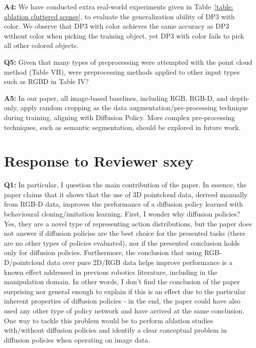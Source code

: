 \noindent\textbf{A4:} We have conducted extra real-world experiments given in Table~\ref{table: ablation cluttered scenes}, to evaluate the generalization ability of DP3 with color. We observe that DP3 with color achieves the same accuracy as DP3 without color when picking the training object, yet DP3 with color fails to pick all other colored objects.

\vspace{0.1in}

\noindent\textbf{Q5:} Given that many types of preprocessing were attempted with the point cloud method (Table VII), were preprocessing methods applied to other input types such as RGBD in Table IV?


\noindent\textbf{A5:} In our paper, all image-based baselines, including RGB, RGB-D, and depth-only, apply random cropping as the data augmentation/pre-processing technique during training, aligning with Diffusion Policy. More complex pre-processing techniques, such as semantic segmentation, should be explored in future work.

\section*{Response to Reviewer sxey}

\noindent\textbf{Q1:} In particular, I question the main contribution of the paper. In essence, the paper claims that it shows that the use of 3D pointcloud data, derived manually from RGB-D data, improves the performance of a diffusion policy learned with behavioural cloning/imitation learning. First, I wonder why diffusion policies? Yes, they are a novel type of representing action distributions, but the paper does not answer if diffusion policies are the best choice for the presented tasks (there are no other types of policies evaluated), nor if the presented conclusion holds only for diffusion policies. Furthermore, the conclusion that using RGB-D/pointcloud data over pure 2D/RGB data helps improve performance is a known effect addressed in previous robotics literature, including in the manipulation domain. In other words, I don't find the conclusion of the paper surprising nor general enough to explain if this is an effect due to the particular inherent properties of diffusion policies - in the end, the paper could have also used any other type of policy network and have arrived at the same conclusion. One way to tackle this problem would be to perform ablation studies with/without diffusion policies and identify a clear conceptual problem in diffusion policies when operating on image data.

